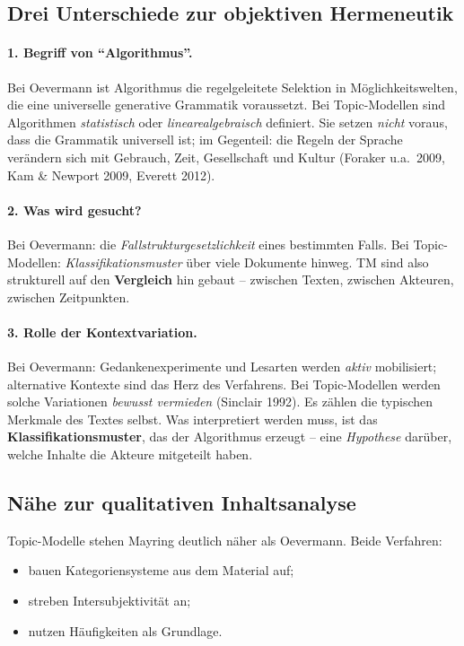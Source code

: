 \documentclass[a4paper,11pt]{article}
\begin{document}
\subsection{Drei Unterschiede zur objektiven Hermeneutik}

\paragraph{1. Begriff von \enquote{Algorithmus}.}
Bei Oevermann ist Algorithmus die regelgeleitete Selektion in
Möglichkeitswelten, die eine universelle generative Grammatik
voraussetzt. Bei Topic-Modellen sind Algorithmen
\emph{statistisch} oder \emph{linearealgebraisch} definiert. Sie
setzen \emph{nicht} voraus, dass die Grammatik universell ist; im
Gegenteil: die Regeln der Sprache verändern sich mit Gebrauch, Zeit,
Gesellschaft und Kultur (Foraker u.a.\ 2009, Kam \& Newport 2009,
Everett 2012).

\paragraph{2. Was wird gesucht?}
Bei Oevermann: die \emph{Fallstrukturgesetzlichkeit} eines bestimmten
Falls. Bei Topic-Modellen: \emph{Klassifikationsmuster} über viele
Dokumente hinweg. TM sind also strukturell auf den \textbf{Vergleich}
hin gebaut -- zwischen Texten, zwischen Akteuren, zwischen Zeitpunkten.

\paragraph{3. Rolle der Kontextvariation.}
Bei Oevermann: Gedankenexperimente und Lesarten werden \emph{aktiv}
mobilisiert; alternative Kontexte sind das Herz des Verfahrens. Bei
Topic-Modellen werden solche Variationen \emph{bewusst vermieden}
(Sinclair 1992). Es zählen die typischen Merkmale des Textes selbst.
Was interpretiert werden muss, ist das \textbf{Klassifikationsmuster},
das der Algorithmus erzeugt -- eine \emph{Hypothese} darüber, welche
Inhalte die Akteure mitgeteilt haben.

\subsection{Nähe zur qualitativen Inhaltsanalyse}

Topic-Modelle stehen Mayring deutlich näher als Oevermann. Beide
Verfahren:

\begin{itemize}
\item bauen Kategoriensysteme aus dem Material auf;
\item streben Intersubjektivität an;
\item nutzen Häufigkeiten als Grundlage.
\end{itemize}
\end{document}
